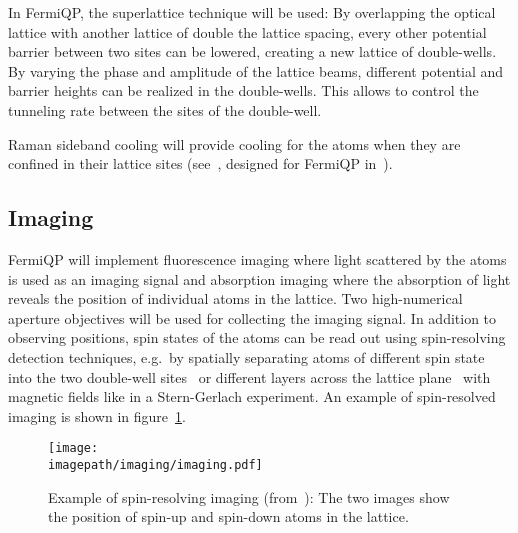 In FermiQP, the superlattice technique will be used: By overlapping the optical lattice with another lattice of double the lattice spacing, every other potential barrier between two sites can be lowered, creating a new lattice of double-wells. By varying the phase and amplitude of the lattice beams, different potential and barrier heights can be realized in the double-wells. This allows to control the tunneling rate between the sites of the double-well.

Raman sideband cooling will provide cooling for the atoms when they are confined in their lattice sites (see~\cite*{hilker_spin-resolved_2017}, designed for FermiQP in~\cite{krumm_notitle_2022}).

\subsection*{Imaging}
FermiQP will implement fluorescence imaging where light scattered by the atoms is used as an imaging signal and absorption imaging where the absorption of light reveals the position of individual atoms in the lattice. Two high-numerical aperture objectives will be used for collecting the imaging signal. In addition to observing positions, spin states of the atoms can be read out using spin-resolving detection techniques, e.g.~by spatially separating atoms of different spin state into the two double-well sites~\cite{boll_spin-_2016} or different layers across the lattice plane~\cite{koepsell_robust_2020} with magnetic fields like in a Stern-Gerlach experiment. An example of spin-resolved imaging is shown in figure~\ref{fig:absorption_image}.

\begin{figure}
    \centering
    \texttt{[image: \\imagepath/imaging/imaging.pdf]}
    \caption{Example of spin-resolving imaging (from~\cite{koepsell_robust_2020}): The two images show the position of spin-up and spin-down atoms in the lattice.}
    \label{fig:absorption_image}
\end{figure}

